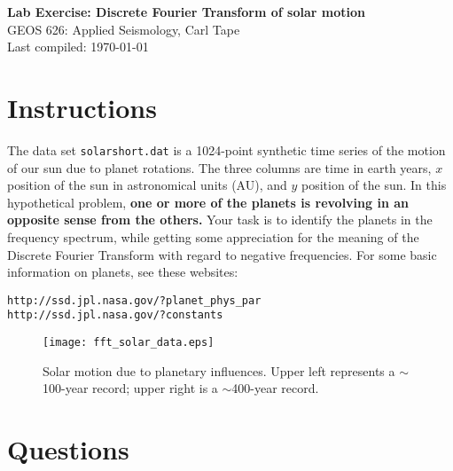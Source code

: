 \documentclass[11pt,titlepage,fleqn]{article}
\begin{document}

\begin{spacing}{1.2}
\centering
{\large \bf Lab Exercise: Discrete Fourier Transform of solar motion} \\
GEOS 626: Applied Seismology, Carl Tape \\
Last compiled: \today \\
\end{spacing}


\section*{Instructions}

The data set \verb+solarshort.dat+ is a 1024-point synthetic time series of the motion of our sun due to planet rotations. The three columns are time in earth years, $x$ position of the sun in astronomical units (AU), and $y$ position of the sun. In this hypothetical problem, {\bf one or more of the planets is revolving in an opposite sense from the others.} Your task is to identify the planets in the frequency spectrum, while getting some appreciation for the meaning of the Discrete Fourier Transform with regard to negative frequencies. For some basic information on planets, see these websites:
%
\begin{verbatim}
http://ssd.jpl.nasa.gov/?planet_phys_par
http://ssd.jpl.nasa.gov/?constants
\end{verbatim}

\begin{figure}[h]
\centering
\texttt{[image: fft\_solar\_data.eps]}
\caption[]
{{
Solar motion due to planetary influences. Upper left represents a $\sim$100-year record; upper right is a $\sim$400-year record.
\label{fig:solar}
}}
\end{figure}


\section*{Questions}
\end{document}
